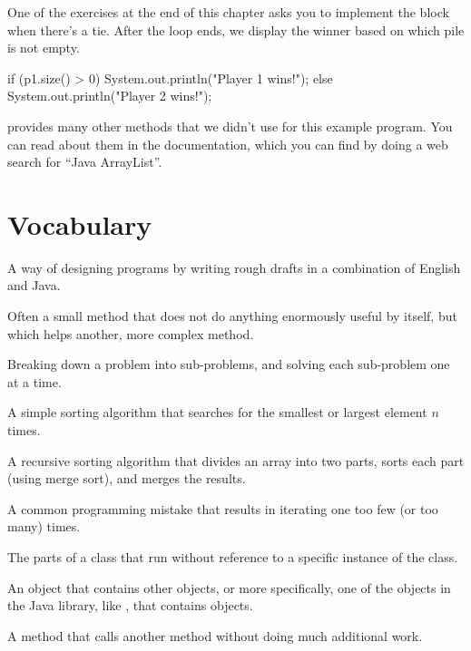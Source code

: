 One of the exercises at the end of this chapter asks you to implement the  block when there's a tie.
After the  loop ends, we display the winner based on which pile is not empty.

\begin{code}
if (p1.size() > 0) {
    System.out.println("Player 1 wins!");
} else {
    System.out.println("Player 2 wins!");
}
\end{code}

 provides many other methods that we didn't use for this example program.
You can read about them in the documentation, which you can find by doing a web search for ``Java ArrayList''.


\section{Vocabulary}

\begin{description}

A way of designing programs by writing rough drafts in a combination of English and Java.

Often a small method that does not do anything enormously useful by itself, but which helps another, more complex method.

Breaking down a problem into sub-problems, and solving each sub-problem one at a time.

A simple sorting algorithm that searches for the smallest or largest element $n$ times.

A recursive sorting algorithm that divides an array into two parts, sorts each part (using merge sort), and merges the results.

A common programming mistake that results in iterating one too few (or too many) times.


The parts of a class that run without reference to a specific instance of the class.

An object that contains other objects, or more specifically, one of the objects in the Java library, like , that contains objects.

A method that calls another method without doing much additional work.

\end{description}


